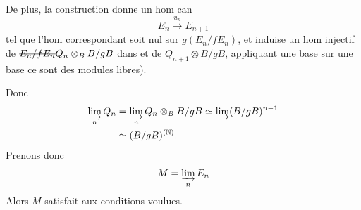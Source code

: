 De plus, la construction donne un hom can
\[
E_n\xrightarrow{u_n}E_{n+1}
\]
tel que l'hom correspondant
soit \uline{nul} sur $g(E_n/fE_n)$, et induise un hom injectif de  $\deleted{E_n/fE_n}Q_n\otimes_B B/gB$ dans  et de $Q_{n+1}\otimes B/gB$, appliquant une base sur une base ce sont des modules libres).

Donc
\[
\begin{aligned}
\varinjlim_n Q_n&=\varinjlim_n Q_n\otimes_B B/gB\simeq\varinjlim (B/gB)^{n-1}\\
&\simeq (B/gB)^{(\mathbb N)}.
\end{aligned}
\]
Prenons donc
\[
M=\varinjlim_n E_n
\]
Alors $M$ satisfait aux conditions voulues.

